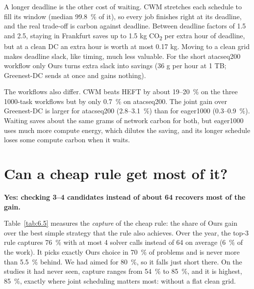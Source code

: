 \documentclass[12pt,a4paper,oneside,openany]{report}
\begin{document}
A longer deadline is the other cost of waiting. CWM stretches each
schedule to fill its window (median 99.8~\% of it), so every job
finishes right at its deadline, and the real trade-off is carbon against
deadline. Between deadline factors of 1.5 and 2.5, staying in Frankfurt
saves up to 1.5 kg CO\textsubscript{2} per extra hour of deadline, but at a clean DC an
extra hour is worth at most 0.17 kg. Moving to a clean grid makes
deadline slack, like timing, much less valuable. For the short
atacseq200 workflow only Ours turns extra slack into savings (36 g per
hour at 1 TB; Greenest-DC sends at once and gains nothing).

The workflows also differ. CWM beats HEFT by about 19--20~\% on the
three 1000-task workflows but by only 0.7~\% on atacseq200. The joint
gain over Greenest-DC is larger for atacseq200 (2.8--3.1~\%) than for
eager1000 (0.3--0.9~\%). Waiting saves about the same grams of network
carbon for both, but eager1000 uses much more compute energy, which
dilutes the saving, and its longer schedule loses some compute carbon
when it waits.

\section{Can a cheap rule get most of it?}\label{sec:6.5}

\textbf{Yes: checking 3--4 candidates instead of about 64 recovers most
of the gain.}

Table~\ref{tab:6.5} measures the \emph{capture} of the cheap rule: the share of
Ours\textquotesingle{} gain over the best simple strategy that the rule
also achieves. Over the year, the top-3 rule captures 76~\% with at most
4 solver calls instead of 64 on average (6~\% of the work). It picks
exactly Ours\textquotesingle{} choice in 70~\% of problems and is never
more than 5.5~\% behind. We had aimed for 80~\%, so it falls just short
there. On the studies it had never seen, capture ranges from 54~\% to
85~\%, and it is highest, 85~\%, exactly where joint scheduling matters
most: without a flat clean grid.
\end{document}

